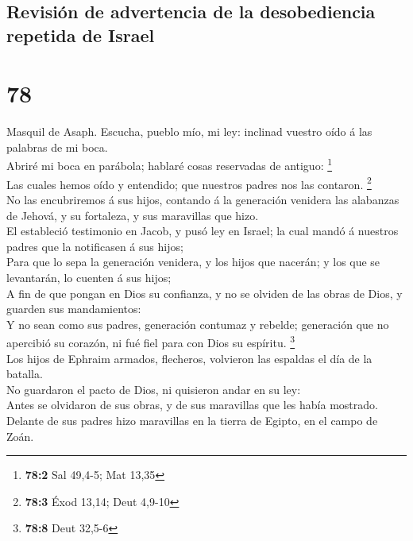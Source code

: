 \hypertarget{revisiuxf3n-de-advertencia-de-la-desobediencia-repetida-de-israel}{%
\subsection{Revisión de advertencia de la desobediencia repetida de
Israel}\label{revisiuxf3n-de-advertencia-de-la-desobediencia-repetida-de-israel}}

\hypertarget{section-77}{%
\section{78}\label{section-77}}

 Masquil de Asaph. Escucha, pueblo mío, mi ley: inclinad
vuestro oído á las palabras de mi boca.\\
 Abriré mi boca en parábola; hablaré cosas reservadas de
antiguo: \footnote{\textbf{78:2} Sal 49,4-5; Mat 13,35}\\
 Las cuales hemos oído y entendido; que nuestros padres
nos las contaron. \footnote{\textbf{78:3} Éxod 13,14; Deut 4,9-10}\\
 No las encubriremos á sus hijos, contando á la generación
venidera las alabanzas de Jehová, y su fortaleza, y sus maravillas que
hizo.\\
 El estableció testimonio en Jacob, y pusó ley en Israel;
la cual mandó á nuestros padres que la notificasen á sus hijos;\\
 Para que lo sepa la generación venidera, y los hijos que
nacerán; y los que se levantarán, lo cuenten á sus hijos;\\
 A fin de que pongan en Dios su confianza, y no se olviden
de las obras de Dios, y guarden sus mandamientos:\\
 Y no sean como sus padres, generación contumaz y rebelde;
generación que no apercibió su corazón, ni fué fiel para con Dios su
espíritu. \footnote{\textbf{78:8} Deut 32,5-6}\\
 Los hijos de Ephraim armados, flecheros, volvieron las
espaldas el día de la batalla.\\
 No guardaron el pacto de Dios, ni quisieron andar en su
ley:\\
 Antes se olvidaron de sus obras, y de sus maravillas que
les había mostrado.\\
 Delante de sus padres hizo maravillas en la tierra de
Egipto, en el campo de Zoán.\\
